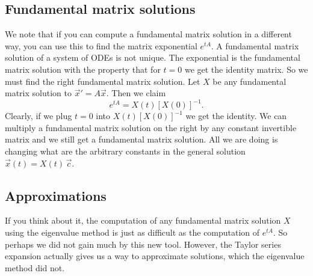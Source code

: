 \subsection{Fundamental matrix solutions}

We note that if you can compute a fundamental matrix solution
in a different way, you can use this to find the matrix exponential $e^{tA}$.
A fundamental matrix solution of a system of ODEs is not unique.  The
exponential is the fundamental matrix solution with the property that
for $t=0$ we get the identity matrix.  So we
must find the right fundamental matrix solution.  Let $X$ be any fundamental
matrix solution to ${\vec{x}}' = A \vec{x}$.  Then we claim
\begin{equation*}
e^{tA} = X(t) \left[ X(0) \right]^{-1} .
\end{equation*}
Clearly, if we plug $t=0$ into 
$X(t) \left[ X(0) \right]^{-1}$ we get the identity.  
We can multiply a fundamental matrix solution on the right by any
constant invertible matrix and we still get a fundamental matrix solution.
All we are doing is changing what are the arbitrary constants in the general
solution $\vec{x}(t) = X(t)\, \vec{c}$.

\subsection{Approximations}

If you think about it, the computation of any fundamental matrix solution
$X$ using the eigenvalue method is
just as difficult as the computation of $e^{tA}$.
So perhaps we did not gain
much by this new tool.  However, the Taylor series expansion actually gives
us a way to approximate solutions, which the eigenvalue method did
not.

